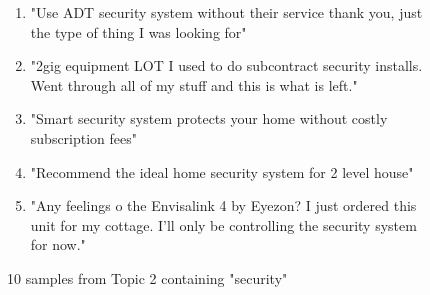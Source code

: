 \documentclass{article}
\begin{document}
\begin{figure}[H]
\begin{footnotesize}
\begin{enumerate}
            \item "Use ADT security system without their service  thank you, just the type of thing I was looking for"
            \item "2gig equipment LOT  I used to do subcontract security installs. Went through all of my stuff and this is what is left."
            \item "Smart security system protects your home without costly subscription fees"
            \item "Recommend the ideal home security system for 2 level house"
            \item "Any feelings o the Envisalink 4 by Eyezon? I just ordered this unit for my cottage. I'll only be controlling the security system for now."
            
        \end{enumerate}
    \end{footnotesize}
        \caption{10 samples from Topic 2 containing "security"}
    \end{figure}
\end{document}
